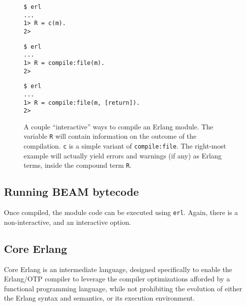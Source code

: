 \begin{figure}[ht!]
\begin{minipage}[t]{0.2\textwidth}
\begin{lstlisting}
$ erl
...
1> R = c(m).
2>
\end{lstlisting}
\end{minipage}%
\begin{minipage}[t]{0.35\textwidth}
\begin{lstlisting}
$ erl
...
1> R = compile:file(m).
2>
\end{lstlisting}
\end{minipage}%
\begin{minipage}[t]{0.45\textwidth}
\begin{lstlisting}
$ erl
...
1> R = compile:file(m, [return]).
2>
\end{lstlisting}
\end{minipage}%
\caption{A couple ``interactive'' ways to compile an Erlang module.
The variable \texttt{R} will contain information on the outcome of the
compilation. \texttt{c} is a simple variant of \texttt{compile:file}.
The right-most example will actually yield errors and warnings (if
any) as Erlang terms, inside the compound term \texttt{R}.}
\label{fig:erl-c}
\end{figure}

\subsection{Running BEAM bytecode}

Once compiled, the module code can be executed using \texttt{erl}.
Again, there is a non-interactive, and an interactive option.

\subsection{Core Erlang}

Core Erlang\cite{erlang:erlang:2001:core-intro, erlang:2004:core-spec}
is an intermediate language, designed specifically to enable the
Erlang/OTP compiler to leverage the compiler optimizations afforded by
a functional programming language, while not prohibiting the evolution
of either the Erlang syntax and semantics, or its execution
environment.

